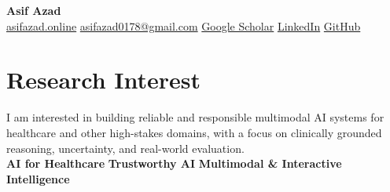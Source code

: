 \documentclass[10pt,letterpaper]{article}
\makeatletter
\newenvironment{entry}
    {\begin{minipage}{\linewidth}\color{textColor}}
    {\end{minipage}}
\newcommand{\daterow}[3]{%
    \begin{tabularx}{\linewidth}{@{}X>{\raggedleft\arraybackslash}p{3.8cm}@{}}
        #1 & \textcolor{mutedColor}{#2}\\
        #3 &
    \end{tabularx}
}
\makeatother
\begin{document}
\begin{center}
    {\fontsize{22pt}{25pt}\selectfont\bfseries\color{primaryColor} Asif Azad}\\[0.32em]
    \href{https://asifazad.online/}{asifazad.online}
    \enspace\textcolor{mutedColor}{\textbar}\enspace
    \href{mailto:asifazad0178@gmail.com}{asifazad0178@gmail.com}
    \enspace\textcolor{mutedColor}{\textbar}\enspace
    \href{https://scholar.google.com/citations?user=nDhZSTQAAAAJ}{Google Scholar}
    \enspace\textcolor{mutedColor}{\textbar}\enspace
    \href{https://www.linkedin.com/in/asifazad2677}{LinkedIn}
    \enspace\textcolor{mutedColor}{\textbar}\enspace
    \href{https://github.com/BRAINIAC2677}{GitHub}
\end{center}
\vspace{-0.35em}

\section{Research Interest}
\begin{entry}
I am interested in building reliable and responsible multimodal AI systems for healthcare and other high-stakes domains, with a focus on clinically grounded reasoning, uncertainty, and real-world evaluation.\\[0.38em]
\textbf{AI for Healthcare}
\enspace\textcolor{primaryColor}{\textbullet}\enspace
\textbf{Trustworthy AI}
\enspace\textcolor{primaryColor}{\textbullet}\enspace
\textbf{Multimodal \& Interactive Intelligence}
\end{entry}

\newcommand{\educationsection}{%
\section{Education}
\begin{entry}
\daterow
    {\textbf{Bangladesh University of Engineering and Technology (BUET)}}
    {Feb 2020 -- Mar 2025}
    {B.Sc. in Computer Science and Engineering}
\vspace{0.16em}
\textbf{CGPA:} 3.91/4.00
\enspace\textcolor{mutedColor}{\textbar}\enspace
\textbf{Top 10\%}
\enspace\textcolor{mutedColor}{\textbar}\enspace
\textbf{Dean's List:} three consecutive years\\[0.28em]
\textbf{Undergraduate thesis:}
\href{https://link.springer.com/chapter/10.1007/978-3-032-00652-3_3}{\textit{Beyond Accuracy: Enhancing Parkinson's Diagnosis with Uncertainty Quantification of Machine Learning Models}}\\[0.28em]
\textbf{Supervisor:} \href{https://cse.buet.ac.bd/faculty/faculty_detail/mrahman}{Prof. M Saifur Rahman}
\enspace\textcolor{mutedColor}{\textbar}\enspace
\textbf{Best Paper Award nominee}, AI in Healthcare Conference (AIiH) 2025
\end{entry}
}
\end{document}
